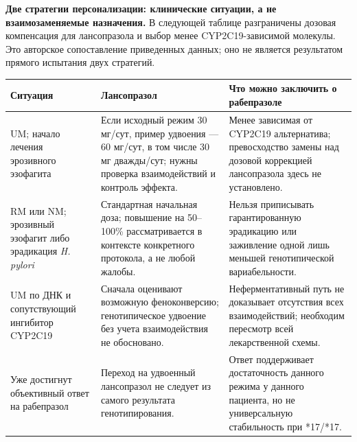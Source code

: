 \documentclass[11pt,a4paper,notitlepage]{report}
\newcommand{\Hp}{\textit{H. pylori}}
\newcommand{\src}[1]{\unskip\space\cite{#1}}
\begin{document}
\textbf{Две стратегии персонализации: клинические ситуации, а не взаимозаменяемые назначения.} В следующей таблице разграничены дозовая компенсация для лансопразола и выбор менее CYP2C19-зависимой молекулы. Это авторское сопоставление приведенных данных; оно не является результатом прямого испытания двух стратегий.\src{leonova2015,cpic,asge2025}
\begin{longtable}{P{0.26\textwidth}P{0.34\textwidth}P{0.31\textwidth}}
\toprule
Ситуация & Лансопразол & Что можно заключить о рабепразоле \\
\midrule
\endhead
UM; начало лечения эрозивного эзофагита & Если исходный режим 30 мг/сут, пример удвоения --- 60 мг/сут, в том числе 30 мг дважды/сут; нужны проверка взаимодействий и контроль эффекта. & Менее зависимая от CYP2C19 альтернатива; превосходство замены над дозовой коррекцией лансопразола здесь не установлено. \\
RM или NM; эрозивный эзофагит либо эрадикация \Hp & Стандартная начальная доза; повышение на 50--100\% рассматривается в контексте конкретного протокола, а не любой жалобы. & Нельзя приписывать гарантированную эрадикацию или заживление одной лишь меньшей генотипической вариабельности. \\
UM по ДНК и сопутствующий ингибитор CYP2C19 & Сначала оценивают возможную феноконверсию; генотипическое удвоение без учета взаимодействия не обосновано. & Неферментативный путь не доказывает отсутствия всех взаимодействий; необходим пересмотр всей лекарственной схемы. \\
Уже достигнут объективный ответ на рабепразол & Переход на удвоенный лансопразол не следует из самого результата генотипирования. & Ответ поддерживает достаточность данного режима у данного пациента, но не универсальную стабильность при *17/*17. \\
\bottomrule
\end{longtable}
\end{document}

